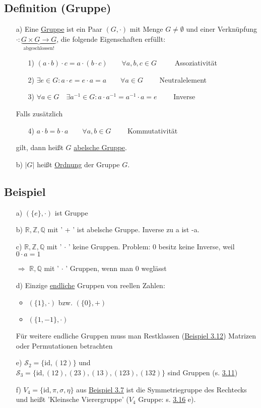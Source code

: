 \documentclass[12pt,titlepage, pdf]{article}
\newcommand{\R}{\mathds{R}}
\newcommand{\uline}[1]{\underline{#1}}
\newcommand{\id}{\textrm{id}}
\renewcommand{\>}{\rightarrow}
\renewcommand{\*}{\cdot}
\begin{document}
\subsection{Definition (Gruppe)}
\begin{itemize}
	\item[a)] Eine \uline{Gruppe} ist ein Paar $(G, \cdot) $ mit Menge $G \neq \emptyset$ und einer Verknüpfung $\cdot : \underbrace{G \times G \rightarrow G}_{\text{abgeschlossen!}}$, die folgende Eigenschaften erfüllt:
	\begin{itemize}
		\item[1)] $(a \cdot b) \cdot c = a \cdot (b \cdot c) \qquad \forall a,b,c \in G\qquad~$ Assoziativität
		\item[2)] $\exists e \in G: a \cdot e = e \cdot a = a \qquad \forall a \in G\qquad$ Neutralelement
		\item[3)] $\forall a \in G\quad \exists a^{-1} \in G: a \cdot a^{-1} = a^{-1}\*a = e\qquad$ Inverse
	\end{itemize}
		Falls zusätzlich 
		\begin{itemize}
			\item[4)] $a \cdot b = b \cdot a \qquad  \forall a,b \in G\qquad$ Kommutativität \end{itemize}
		gilt, dann heißt $G$ \uline{abelsche Gruppe}.
	
	\item[b)] $| G |$ heißt \uline{Ordnung} der Gruppe $G$.
\end{itemize}
\subsection{Beispiel}
\label{3.10}
\begin{itemize}
	\item[a)] $(\{e\}, \cdot )$ ist Gruppe
	\item[b)] $\R, \mathds{Z}, \mathds{Q}$ mit ' + ' ist abelsche Gruppe. Inverse zu a ist -a.
	\item[c)] $\R, \mathds{Z}, \mathds{Q}$ mit ' $\cdot$ ' keine Gruppen. Problem: 0 besitz keine Inverse, weil \\
	$0 \cdot a = 1$\Lightning
	\item[$\Rightarrow$]  $\R, \mathds{Q}$ mit ' $\cdot$ ' Gruppen, wenn man 0 weglässt
	\item[d)] Einzige \uline{endliche} Gruppen von reellen Zahlen: 
	\begin{itemize}
		\item $(\{1\}, \cdot )$ bzw. $(\{0\}, + )$
		\item $(\{1,-1\}, \cdot)$
	\end{itemize}
	Für weitere endliche Gruppen muss man Restklassen (\hyperref[3.12]{Beispiel 3.12}) Matrizen oder Permutationen betrachten
	\item[e)] $\mathscr{S}_2 = \{\id, (12)\}$ und \\
	$\mathscr{S}_3 = \{\id, (12), (23),(13),(123),(132)\}$ sind Gruppen (s. \hyperref[3.11]{3.11})
	\item[f)] $V_4 = \{\id, \pi, \sigma, \eta \}$ aus \hyperref[3.7]{Beispiel 3.7} ist die Symmetriegruppe des Rechtecks und heißt 'Kleinsche Vierergruppe' ($V_4$ Gruppe: s. \hyperref[3.16]{3.16} e).
\end{itemize}
\end{document}
